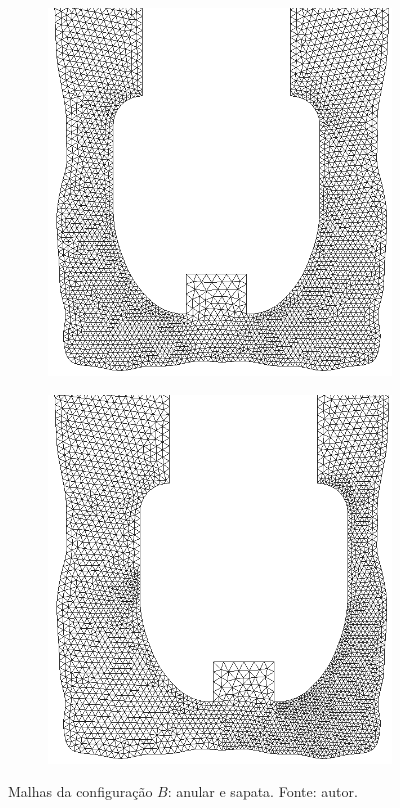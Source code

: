 \begin{figure}[H]
\begin{subfigure}[b]{0.1\linewidth}
	\end{subfigure}
	\\
	\begin{subfigure}[b]{0.3\linewidth}
		\includegraphics[width=\linewidth]{img/Rugosa_sapata.png}
	\end{subfigure}
	\quad
	\quad
	\quad
	\quad
	\quad
	\begin{subfigure}[b]{0.3\linewidth}
		\includegraphics[width=\linewidth]{img/Rugosa_standoff_sapata.png}
	\end{subfigure}
	\caption[Malhas da configuração $B$: anular e sapata.]{Malhas da configuração $B$: anular e sapata. Fonte: autor.}
	\label{fig:malha_C_D}
\end{figure}
